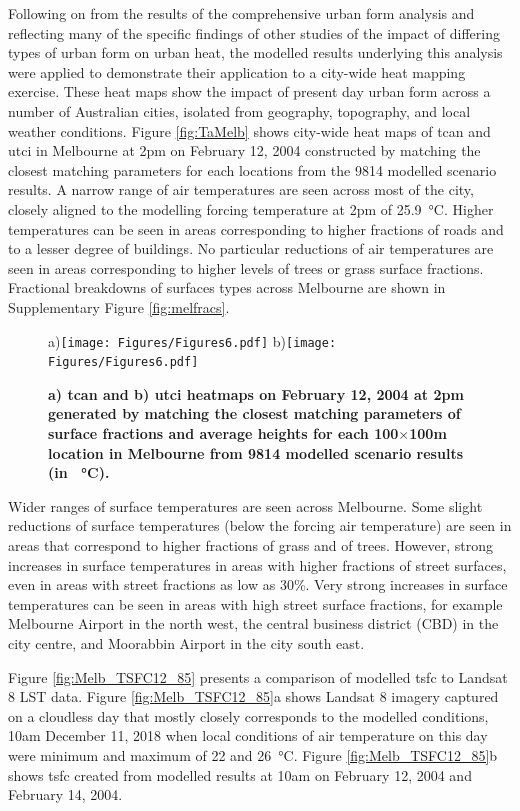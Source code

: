 \documentclass[final,3p,times,authoryear]{elsarticle}
\begin{document}
Following on from the results of the comprehensive urban form analysis and reflecting many of the specific findings of other studies of the impact of differing types of urban form on urban heat, the modelled results underlying this analysis were applied to demonstrate their application to a city-wide heat mapping exercise. These heat maps show the impact of present day urban form across a number of Australian cities, isolated from geography, topography, and local weather conditions. Figure \ref{fig:TaMelb} shows city-wide heat maps of \gls{tcan} and \gls{utci} in Melbourne at 2pm on February 12, 2004 constructed by matching the closest matching parameters for each locations from the 9814 modelled scenario results. A narrow range of air temperatures are seen across most of the city, closely aligned to the modelling forcing temperature at 2pm of 25.9\SI{}{\degreeCelsius}. Higher temperatures can be seen in areas corresponding to higher fractions of roads and to a lesser degree of buildings. No particular reductions of air temperatures are seen in areas corresponding to higher levels of trees or grass surface fractions. Fractional breakdowns of surfaces types across Melbourne are shown in Supplementary Figure \ref{fig:melfracs}. 


\begin{figure}
\centering
a)\texttt{[image: Figures/Figures6.pdf]}
b)\texttt{[image: Figures/Figures6.pdf]}
\caption{\bf a) \gls{tcan} and b) \gls{utci} heatmaps on February 12, 2004 at 2pm generated by matching the closest matching parameters of surface fractions and average heights for each 100$\times$100m location in Melbourne from 9814 modelled scenario results (in \SI{}{\degreeCelsius}). }
 \label{fig:TaMelb}  \label{fig:utciMelb}
\end{figure}


Wider ranges of surface temperatures are seen across Melbourne. Some slight reductions of surface temperatures (below the forcing air temperature) are seen in areas that correspond to higher fractions of grass and of trees. However, strong increases in surface temperatures in areas with higher fractions of street surfaces, even in areas with street fractions as low as 30\%.  Very strong increases in surface temperatures can be seen in areas with high street surface fractions, for example Melbourne Airport in the north west, the central business district (CBD) in the city centre, and Moorabbin Airport in the city south east.

Figure \ref{fig:Melb_TSFC12_85} presents a comparison of modelled \gls{tsfc} to Landsat 8 LST data. Figure \ref{fig:Melb_TSFC12_85}a shows Landsat 8 imagery captured on a cloudless day that mostly closely corresponds to the modelled conditions, 10am December 11, 2018 when local conditions of air temperature on this day were minimum and maximum of 22 and 26\SI{}{\degreeCelsius}. Figure \ref{fig:Melb_TSFC12_85}b shows \gls{tsfc} created from modelled results at 10am on February 12, 2004 and February 14, 2004. 
\end{document}
